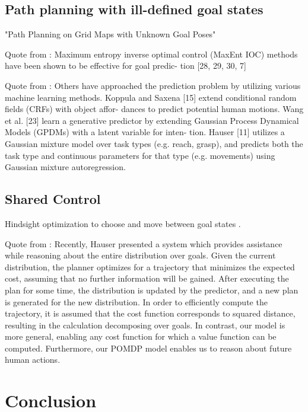 \subsection{Path planning with ill-defined goal states}
"Path Planning on Grid Maps with Unknown Goal Poses"

Quote from \cite{javdani2015shared}:
Maximum  entropy  inverse  optimal  control  (MaxEnt  IOC)
methods  have  been  shown  to  be  effective  for  goal  predic-
tion [28, 29, 30, 7]

Quote from \cite{javdani2015shared}:
Others have approached the prediction problem by utilizing
various machine learning methods. Koppula and Saxena [15]
extend  conditional  random  fields  (CRFs)  with  object  affor-
dances  to  predict  potential  human  motions.  Wang  et  al.  [23]
learn  a  generative  predictor  by  extending  Gaussian  Process
Dynamical Models (GPDMs) with a latent variable for inten-
tion. Hauser [11] utilizes a Gaussian mixture model over task
types  (e.g.  reach,  grasp),  and  predicts  both  the  task  type  and
continuous  parameters  for  that  type  (e.g.  movements)  using
Gaussian mixture autoregression.

\subsection{Shared Control}
Hindsight optimization to choose and move between goal states
\cite{javdani2015shared}.

Quote from \cite{javdani2015shared}:
Recently,  Hauser  presented  a  system  which  provides
assistance  while  reasoning  about  the  entire  distribution  over
goals.  Given  the  current  distribution,  the  planner  optimizes
for  a  trajectory  that  minimizes  the  expected  cost,  assuming
that no further information will be gained. After executing the
plan for some time, the distribution is updated by the predictor,
and a new plan is generated for the new distribution. In order
to  efficiently  compute  the  trajectory,  it  is  assumed  that  the
cost function corresponds to squared distance, resulting in the
calculation decomposing over goals. In contrast, our model is
more  general,  enabling  any  cost  function  for  which  a  value
function  can  be  computed.  Furthermore,  our  POMDP  model
enables us to reason about future human actions.  \cite{hauser2013recognition}

\section{Conclusion}

